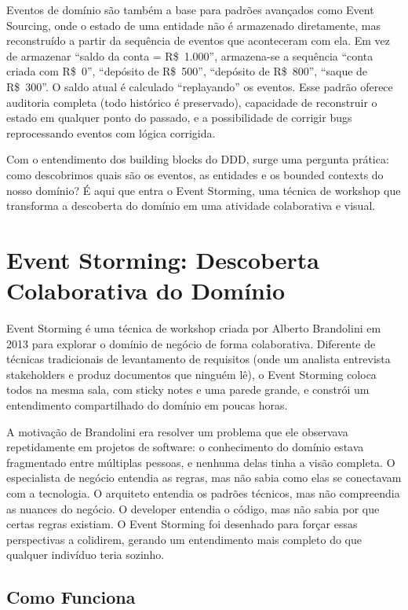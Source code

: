 Eventos de domínio são também a base para padrões avançados como Event Sourcing,
onde o estado de uma entidade não é armazenado diretamente, mas reconstruído a
partir da sequência de eventos que aconteceram com ela. Em vez de armazenar
``saldo da conta = R\$~1.000'', armazena-se a sequência ``conta criada com
R\$~0'', ``depósito de R\$~500'', ``depósito de R\$~800'', ``saque de R\$~300''.
O saldo atual é calculado ``replayando'' os eventos. Esse padrão oferece
auditoria completa (todo histórico é preservado), capacidade de reconstruir
o estado em qualquer ponto do passado, e a possibilidade de corrigir bugs
reprocessando eventos com lógica corrigida.

Com o entendimento dos building blocks do DDD, surge uma pergunta prática:
como descobrimos quais são os eventos, as entidades e os bounded contexts do
nosso domínio? É aqui que entra o Event Storming, uma técnica de workshop que
transforma a descoberta do domínio em uma atividade colaborativa e visual.


\section{Event Storming: Descoberta Colaborativa do Domínio}

Event Storming é uma técnica de workshop criada por Alberto Brandolini em 2013
para explorar o domínio de negócio de forma colaborativa. Diferente de técnicas
tradicionais de levantamento de requisitos (onde um analista entrevista
stakeholders e produz documentos que ninguém lê), o Event Storming coloca
todos na mesma sala, com sticky notes e uma parede grande, e constrói um
entendimento compartilhado do domínio em poucas horas.

A motivação de Brandolini era resolver um problema que ele observava
repetidamente em projetos de software: o conhecimento do domínio estava
fragmentado entre múltiplas pessoas, e nenhuma delas tinha a visão completa.
O especialista de negócio entendia as regras, mas não sabia como elas se
conectavam com a tecnologia. O arquiteto entendia os padrões técnicos, mas
não compreendia as nuances do negócio. O developer entendia o código, mas
não sabia por que certas regras existiam. O Event Storming foi desenhado
para forçar essas perspectivas a colidirem, gerando um entendimento mais
completo do que qualquer indivíduo teria sozinho.

\subsection{Como Funciona}

